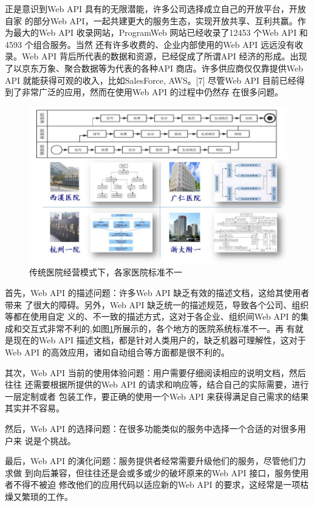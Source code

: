 正是意识到Web API 具有的无限潜能，许多公司选择成立自己的开放平台，开放自家
的部分Web API，一起共建更大的服务生态，实现开放共享、互利共赢。作为最大的Web
API 收录网站，ProgramWeb 网站已经收录了12453 个Web API 和4593 个组合服务。当然
还有许多收费的、企业内部使用的Web API 远远没有收录。Web API 背后所代表的数据和资源，已经促成了所谓API 经济的形成。出现了以京东万象、聚合数据等为代表的各种API
商店。许多供应商仅仅靠提供Web API 就能获得可观的收入，比如SalesForce, AWS。[7]
尽管Web API 目前已经得到了非常广泛的应用，然而在使用Web API 的过程中仍然存
在很多问题。

\begin{figure}[htbp]
  \centering
  \includegraphics[scale=1]{./images/hospitalRunningModel.jpg}
  \caption{传统医院经营模式下，各家医院标准不一}
  \label{fig:hospitalRunningModel}
\end{figure}

首先，Web API 的描述问题：许多Web API 缺乏有效的描述文档，这给其使用者带来
了很大的障碍。另外，Web API 缺乏统一的描述规范，导致各个公司、组织等都在使用自定
义的、不一致的描述方式，这对于各企业、组织间Web API 的集成和交互式非常不利的,如图\ref{fig:hospitalRunningModel}所展示的，各个地方的医院系统标准不一。再
有就是现在的Web API 描述文档，都是针对人类用户的，缺乏机器可理解性，这对于Web
API 的高效应用，诸如自动组合等方面都是很不利的。

其次，Web API 当前的使用体验问题：用户需要仔细阅读相应的说明文档，然后往往
还需要根据所提供的Web API 的请求和响应等，结合自己的实际需要，进行一层定制或者
包装工作，要正确的使用一个Web API 来获得满足自己需求的结果其实并不容易。

然后，Web API 的选择问题：在很多功能类似的服务中选择一个合适的对很多用户来
说是个挑战。

最后，Web API 的演化问题：服务提供者经常需要升级他们的服务，尽管他们力求做
到向后兼容，但往往还是会或多或少的破坏原来的Web API 接口，服务使用者不得不被迫
修改他们的应用代码以适应新的Web API 的要求，这经常是一项枯燥又繁琐的工作。

